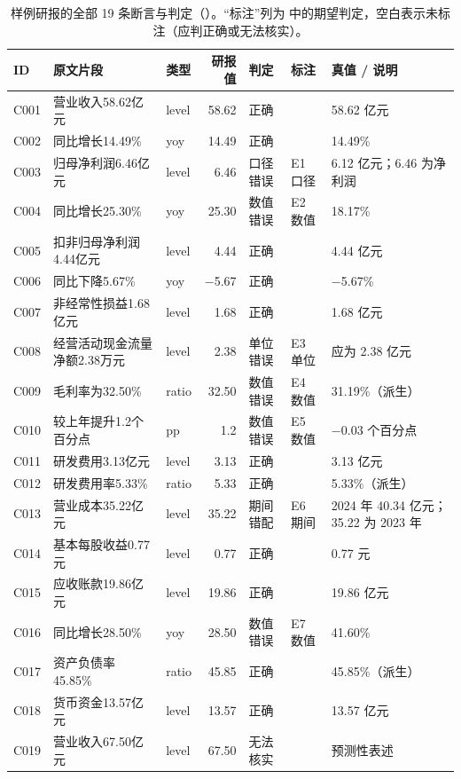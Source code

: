 \begin{table}[t]
\centering
\caption{样例研报的全部 19 条断言与判定（）。“标注”列为  中的期望判定，空白表示未标注（应判正确或无法核实）。}
\label{tab:rc-sample}
\scriptsize
\begin{tabularx}{\linewidth}{@{}l p{2.9cm} l r l l X@{}}
\toprule
ID & 原文片段 & 类型 & 研报值 & 判定 & 标注 & 真值 / 说明 \\
\midrule
C001 & 营业收入58.62亿元 & level & 58.62 & 正确 & & 58.62 亿元 \\
C002 & 同比增长14.49\% & yoy & 14.49 & 正确 & & 14.49\% \\
C003 & 归母净利润6.46亿元 & level & 6.46 & 口径错误 & E1 口径 & 6.12 亿元；6.46 为净利润 \\
C004 & 同比增长25.30\% & yoy & 25.30 & 数值错误 & E2 数值 & 18.17\% \\
C005 & 扣非归母净利润4.44亿元 & level & 4.44 & 正确 & & 4.44 亿元 \\
C006 & 同比下降5.67\% & yoy & $-$5.67 & 正确 & & $-$5.67\% \\
C007 & 非经常性损益1.68亿元 & level & 1.68 & 正确 & & 1.68 亿元 \\
C008 & 经营活动现金流量净额2.38万元 & level & 2.38 & 单位错误 & E3 单位 & 应为 2.38 亿元 \\
C009 & 毛利率为32.50\% & ratio & 32.50 & 数值错误 & E4 数值 & 31.19\%（派生） \\
C010 & 较上年提升1.2个百分点 & pp & 1.2 & 数值错误 & E5 数值 & $-$0.03 个百分点 \\
C011 & 研发费用3.13亿元 & level & 3.13 & 正确 & & 3.13 亿元 \\
C012 & 研发费用率5.33\% & ratio & 5.33 & 正确 & & 5.33\%（派生） \\
C013 & 营业成本35.22亿元 & level & 35.22 & 期间错配 & E6 期间 & 2024 年 40.34 亿元；35.22 为 2023 年 \\
C014 & 基本每股收益0.77元 & level & 0.77 & 正确 & & 0.77 元 \\
C015 & 应收账款19.86亿元 & level & 19.86 & 正确 & & 19.86 亿元 \\
C016 & 同比增长28.50\% & yoy & 28.50 & 数值错误 & E7 数值 & 41.60\% \\
C017 & 资产负债率45.85\% & ratio & 45.85 & 正确 & & 45.85\%（派生） \\
C018 & 货币资金13.57亿元 & level & 13.57 & 正确 & & 13.57 亿元 \\
C019 & 营业收入67.50亿元 & level & 67.50 & 无法核实 & & 预测性表述 \\
\bottomrule
\end{tabularx}
\end{table}


